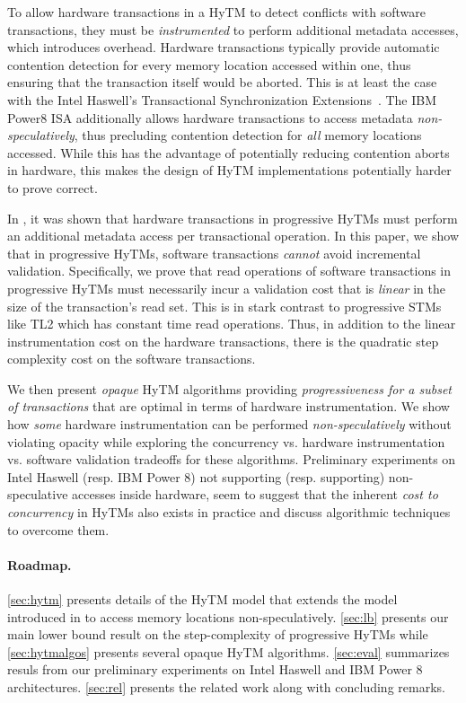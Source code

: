 To allow hardware transactions in a HyTM to detect conflicts with software transactions, they must be \emph{instrumented} to perform additional metadata accesses, which introduces overhead.
Hardware transactions typically provide automatic contention detection for every memory location accessed within one,
thus ensuring that the transaction itself would be aborted.
This is at least the case with the Intel Haswell's Transactional Synchronization Extensions~\cite{haswell}.
The IBM Power8 ISA additionally allows hardware transactions to access metadata \emph{non-speculatively}, thus precluding
contention detection for \emph{all} memory locations accessed. While this has the advantage of potentially reducing contention aborts
in hardware, this makes the design of HyTM implementations potentially harder to prove correct.

In \cite{htmdisc15}, it was shown that hardware transactions in progressive HyTMs must perform
an additional metadata access per transactional operation.
In this paper, we show that in progressive HyTMs, 
software transactions \textit{cannot} avoid incremental validation.
Specifically, we prove that read operations of software transactions in progressive HyTMs
must necessarily incur a validation cost that is \emph{linear} 
in the size of the transaction's read set. 
This is in stark contrast to progressive STMs like TL2 which has constant time read operations.
Thus, in addition to the linear instrumentation cost on the hardware transactions, there is the quadratic
step complexity cost on the software transactions.

We then present \emph{opaque} HyTM algorithms providing \emph{progressiveness for a subset of transactions} that are  %
optimal in terms of hardware instrumentation. We show 
how \emph{some} hardware instrumentation can be performed \textit{non-speculatively} without violating opacity while exploring the concurrency vs. hardware instrumentation vs. software validation
tradeoffs for these algorithms.
Preliminary experiments on Intel Haswell (resp. IBM Power 8) not supporting (resp. supporting) non-speculative accesses inside hardware,
seem to suggest that the inherent \emph{cost to concurrency} in HyTMs also exists in practice and discuss algorithmic techniques to overcome them.

\paragraph{Roadmap.}
\cref{sec:hytm} presents details of the HyTM model that extends the model introduced in \cite{htmdisc15} 
to access memory locations non-speculatively.
\cref{sec:lb} presents our main lower bound result on the step-complexity of progressive HyTMs
while \cref{sec:hytmalgos} presents several opaque HyTM algorithms.
\cref{sec:eval} summarizes resuls from our preliminary experiments on Intel Haswell and IBM Power 8 architectures.
\cref{sec:rel} presents the related work along with concluding remarks.
%